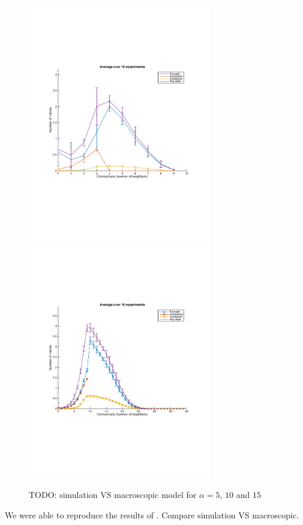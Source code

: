 \documentclass[a4paper, 10pt, conference]{ieeeconf}
\begin{document}
  \begin{figure}[h]
    \begin{center}
      \includegraphics[width=8cm]{figures/simulation-10-alpha4.pdf}
      \includegraphics[width=8cm]{figures/simulation-40-alpha10.pdf}
      \caption{TODO: simulation VS macroscopic model for $\alpha = 5$, $10$ and $15$}
    \end{center}
  \end{figure}

  We were able to reproduce the results of \cite{Winfield08}. Compare simulation VS macroscopic.

\end{document}
